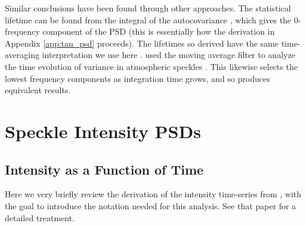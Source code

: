 \documentclass[10pt,preprint]{aastex631}
\begin{document}
Similar conclusions have been found through other approaches.  The statistical lifetime can be found from the integral of the autocovariance \citep{1986JOSAA...3.1001A}, which gives the 0-frequency component of the PSD (this is essentially how the derivation in Appendix \ref{app:tau_psd} proceeds).  The lifetimes so derived have the same time-averaging interpretation we use here \citep{2006ApJ...637..541F}.  \citet{2006OExpr..14.7499P} used the moving average filter to analyze the time evolution of variance in atmospheric speckles \citep[see also][]{2005SPIE.5903..170M}.  This likewise selects the lowest frequency components as integration time grows, and so produces equivalent results.

\section{Speckle Intensity PSDs}
\label{sec:intensity}
\subsection{Intensity as a Function of Time}
Here we very briefly review the derivation of the intensity time-series from \citet{2018JATIS...4a9001M}, with the goal to introduce the notation needed for this analysis.  See that paper for a detailed treatment.

\end{document}
